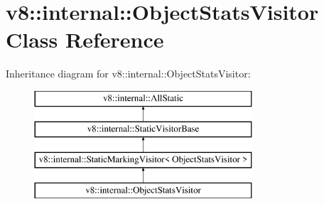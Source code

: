 \hypertarget{classv8_1_1internal_1_1_object_stats_visitor}{}\section{v8\+:\+:internal\+:\+:Object\+Stats\+Visitor Class Reference}
\label{classv8_1_1internal_1_1_object_stats_visitor}
Inheritance diagram for v8\+:\+:internal\+:\+:Object\+Stats\+Visitor\+:\begin{figure}[H]
\begin{center}
\leavevmode
\includegraphics[height=4.000000cm]{classv8_1_1internal_1_1_object_stats_visitor}
\end{center}
\end{figure}
